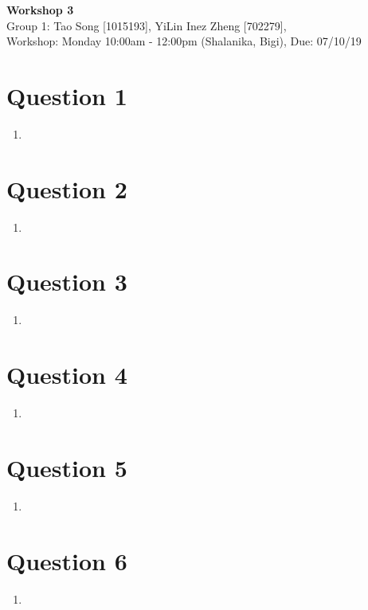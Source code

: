 \documentclass[11pt]{article}
\begin{document}
\begin{center}
\textbf{\Large{Workshop 3}}\\
Group 1: Tao Song [1015193], YiLin Inez Zheng [702279], \\
Workshop: Monday 10:00am - 12:00pm (Shalanika, Bigi), Due: 07/10/19  
\end{center}


\section*{Question 1}
\begin{enumerate}[label=(\alph*)]
\item 

\end{enumerate}


\section*{Question 2}
\begin{enumerate}[label=(\alph*)]
\item 

\end{enumerate}


\section*{Question 3}
\begin{enumerate}[label=(\alph*)]
\item 

\end{enumerate}

\section*{Question 4}
\begin{enumerate}[label=(\alph*)]
\item 

\end{enumerate}

\section*{Question 5}
\begin{enumerate}[label=(\alph*)]
\item 

\end{enumerate}

\section*{Question 6}
\begin{enumerate}[label=(\alph*)]
\item 

\end{enumerate}
\end{document}
